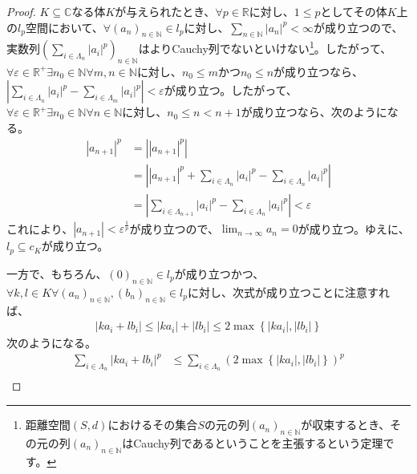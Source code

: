 \documentclass[dvipdfmx]{jsarticle}
\begin{document}
\begin{proof}
$K \subseteq \mathbb{C}$なる体$K$が与えられたとき、$\forall p \in \mathbb{R}$に対し、$1 \leq p$としてその体$K$上の$l_{p}$空間において、$\forall\left( a_{n} \right)_{n \in \mathbb{N}} \in l_{p}$に対し、$\sum_{n \in \mathbb{N}} \left| a_{n} \right|^{p} < \infty$が成り立つので、実数列$\left( \sum_{i \in \varLambda_{n}} \left| a_{i} \right|^{p} \right)_{n \in \mathbb{N}}$はよりCauchy列でないといけない\footnote{距離空間$(S,d)$におけるその集合$S$の元の列$\left( a_{n} \right)_{n \in \mathbb{N}}$が収束するとき、その元の列$\left( a_{n} \right)_{n \in \mathbb{N}}$はCauchy列であるということを主張するという定理です。}。したがって、$\forall\varepsilon \in \mathbb{R}^{+}\exists n_{0} \in \mathbb{N}\forall m,n \in \mathbb{N}$に対し、$n_{0} \leq m$かつ$n_{0} \leq n$が成り立つなら、$\left| \sum_{i \in \varLambda_{n}} \left| a_{i} \right|^{p} - \sum_{i \in \varLambda_{m}} \left| a_{i} \right|^{p} \right| < \varepsilon$が成り立つ。したがって、$\forall\varepsilon \in \mathbb{R}^{+}\exists n_{0} \in \mathbb{N}\forall n \in \mathbb{N}$に対し、$n_{0} \leq n < n + 1$が成り立つなら、次のようになる。
\begin{align*}
\left| a_{n + 1} \right|^{p} &= \left| \left| a_{n + 1} \right|^{p} \right|\\
&= \left| \left| a_{n + 1} \right|^{p} + \sum_{i \in \varLambda_{n}} \left| a_{i} \right|^{p} - \sum_{i \in \varLambda_{n}} \left| a_{i} \right|^{p} \right|\\
&= \left| \sum_{i \in \varLambda_{n + 1}} \left| a_{i} \right|^{p} - \sum_{i \in \varLambda_{n}} \left| a_{i} \right|^{p} \right| < \varepsilon
\end{align*}
これにより、$\left| a_{n + 1} \right| < \varepsilon^{\frac{1}{p}}$が成り立つので、$\lim_{n \rightarrow \infty}a_{n} = 0$が成り立つ。ゆえに、$l_{p} \subseteq c_{K}$が成り立つ。\par
一方で、もちろん、$(0)_{n \in \mathbb{N}} \in l_{p}$が成り立つかつ、$\forall k,l \in K\forall\left( a_{n} \right)_{n \in \mathbb{N}},\left( b_{n} \right)_{n \in \mathbb{N}} \in l_{p}$に対し、次式が成り立つことに注意すれば、
\begin{align*}
\left| ka_{i} + lb_{i} \right| \leq \left| ka_{i} \right| + \left| lb_{i} \right| \leq 2\max\left\{ \left| ka_{i} \right|,\left| lb_{i} \right| \right\}
\end{align*}
次のようになる。
\begin{align*}
\sum_{i \in \varLambda_{n}} \left| ka_{i} + lb_{i} \right|^{p} &\leq \sum_{i \in \varLambda_{n}} \left( 2\max\left\{ \left| ka_{i} \right|,\left| lb_{i} \right| \right\} \right)^{p}\\

\end{align*}
\end{proof}
\end{document}
